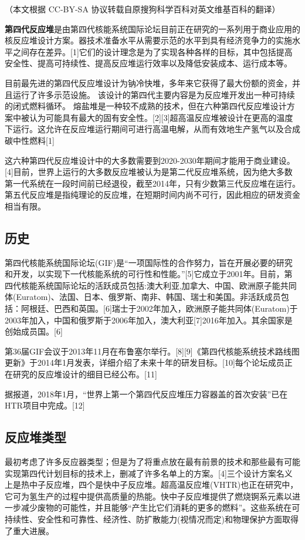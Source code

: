 
（本文根据 CC-BY-SA 协议转载自原搜狗科学百科对英文维基百科的翻译）

\textbf{第四代反应堆}是由第四代核能系统国际论坛目前正在研究的一系列用于商业应用的核反应堆设计方案。器技术准备水平从需要示范的水平到具有经济竞争力的实施水平之间存在差异。[1]它们的设计理念是为了实现各种各样的目标，其中包括提高安全性、提高可持续性、提高反应堆运行效率以及降低安装成本、运行成本等。

目前最先进的第四代反应堆设计为钠冷快堆，多年来它获得了最大份额的资金，并且运行了许多示范设施。 该设计的第四代主要内容是为反应堆开发出一种可持续的闭式燃料循环。 熔盐堆是一种较不成熟的技术，但在六种第四代反应堆设计方案中被认为可能具有最大的固有安全性。[2][3]超高温反应堆被设计在更高的温度下运行。这允许在反应堆运行期间可进行高温电解，从而有效地生产氢气以及合成碳中性燃料[1]

这六种第四代反应堆设计中的大多数需要到2020-2030年期间才能用于商业建设。[4]目前，世界上运行的大多数反应堆被认为是第二代反应堆系统，因为绝大多数第一代系统在一段时间前已经退役，截至2014年，只有少数第三代反应堆在运行。第五代反应堆是指纯理论的反应堆，在短期时间内尚不可行，因此相应的研发资金相当有限。

\subsection{历史}
第四代核能系统国际论坛(GIF)是“一项国际性的合作努力，旨在开展必要的研究和开发，以实现下一代核能系统的可行性和性能。”[5]它成立于2001年。目前，第四代核能系统国际论坛的活跃成员包括:澳大利亚,加拿大、中国、欧洲原子能共同体(Euratom)、法国、日本、俄罗斯、南非、韩国、瑞士和美国。非活跃成员包括：阿根廷、巴西和英国。[6]瑞士于2002年加入，欧洲原子能共同体(Euratom)于2003年加入，中国和俄罗斯于2006年加入，澳大利亚[7]2016年加入。其余国家是创始成员国。[6]

第36届GIF会议于2013年11月在布鲁塞尔举行。[8][9]《第四代核能系统技术路线图更新》于2014年1月发表，详细介绍了未来十年的研发目标。[10]每个论坛成员正在研究的反应堆设计的细目已经公布。[11]

据报道，2018年1月，“世界上第一个第四代反应堆压力容器盖的首次安装”已在HTR项目中完成。[12]

\subsection{反应堆类型}
最初考虑了许多反应器类型；但是为了将重点放在最有前景的技术和那些最有可能实现第四代计划目标的技术上，删减了许多名单上的方案。[4]三个设计方案名义上是热中子反应堆，四个是快中子反应堆。超高温反应堆(VHTR)也正在研究中，它可为氢生产的过程中提供高质量的热能。快中子反应堆提供了燃烧锕系元素以进一步减少废物的可能性，并且能够“产生比它们消耗的更多的燃料”。这些系统在可持续性、安全性和可靠性、经济性、防扩散能力(视情况而定)和物理保护方面取得了重大进展。

